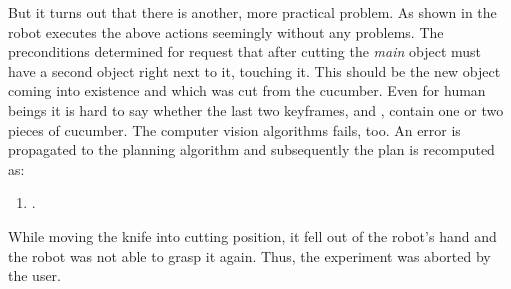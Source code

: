 But it turns out that there is another, more practical problem.
As shown in  the robot executes the above actions seemingly without any problems.
The preconditions determined for  request that after cutting the \emph{main} object must have a second object right next to it, touching it.
This should be the new object coming into existence and which was cut from the cucumber.
Even for human beings it is hard to say whether the last two keyframes,  and , contain one or two pieces of cucumber.
The computer vision algorithms fails, too.
An error is propagated to the planning algorithm and subsequently the plan is recomputed as:

\begin{enumerate}
  \item {}.
\end{enumerate}

While moving the knife into cutting position, it fell out of the robot's hand and the robot was not able to grasp it again.
Thus, the experiment was aborted by the user.

